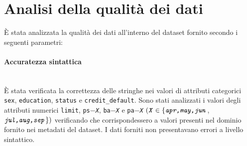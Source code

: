 \section{Analisi della qualità dei dati}
È stata analizzata la qualità dei dati all’interno del dataset fornito secondo i seguenti parametri:

\paragraph{Accuratezza sintattica}\mbox{}\\
È stata verificata la correttezza delle stringhe nei valori di attributi categorici \texttt{sex}, \texttt{education}, \texttt{status} e \texttt{credit\_default}. 
Sono stati analizzati i valori degli attributi numerici \texttt{limit}, \texttt{ps$-$\textit{X}}, \texttt{ba$-$\textit{X}} e \texttt{pa$-$\textit{X}} $(\texttt{\textit{X}} \in \{\texttt{\textit{apr,may,jun}}$,\\$\texttt{\textit{jul,aug,sep}}\})$ verificando che corrispondessero a valori presenti nel dominio fornito nei metadati del dataset. I dati forniti non presentavano errori a livello sintattico.
\mbox{}\\
\mbox{}\\
